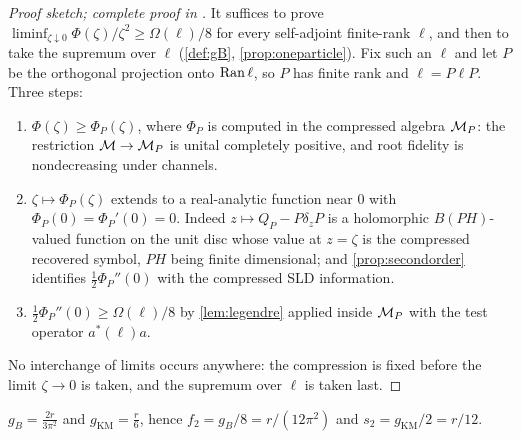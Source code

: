 \begin{proof}[Proof sketch; complete proof in {\cite[\S4, Thm.~4.2]{RigorQL}}]
It suffices to prove
$\liminf_{\zeta\downarrow0}\Phi(\zeta)/\zeta^2\ge\Omega(\ell)/8$ for every
self-adjoint finite-rank $\ell$, and then to take the supremum over $\ell$
(\cref{def:gB}, \cref{prop:oneparticle}).  Fix such an $\ell$ and let $P$ be the
orthogonal projection onto $\operatorname{Ran}\ell$, so $P$ has finite rank and $\ell=P\ell P$.
Three steps:
\begin{enumerate}[label=(\roman*)]
\item $\Phi(\zeta)\ge\Phi_P(\zeta)$, where $\Phi_P$ is computed in the compressed
algebra $\mathcal M_P$: the restriction $\mathcal M\to\mathcal M_P$ is unital completely positive, and
root fidelity is nondecreasing under channels.
\item $\zeta\mapsto\Phi_P(\zeta)$ extends to a real-analytic function near $0$
with $\Phi_P(0)=\Phi_P'(0)=0$.  Indeed $z\mapsto Q_P-P\delta_zP$ is a holomorphic
$B(PH)$-valued function on the unit disc whose value at $z=\zeta$ is the
compressed recovered symbol, $PH$ being finite dimensional; and
\cref{prop:secondorder} identifies $\frac12\Phi_P''(0)$ with the compressed SLD
information.
\item $\frac12\Phi_P''(0)\ge\Omega(\ell)/8$ by \cref{lem:legendre} applied inside
$\mathcal M_P$ with the test operator $a^*(\ell)a$.
\end{enumerate}
No interchange of limits occurs anywhere: the compression is fixed before the
limit $\zeta\to0$ is taken, and the supremum over $\ell$ is taken last.
\end{proof}

\begin{proposition}\label{prop:gBvalue}
$\displaystyle g_B=\frac{2r}{3\pi^2}$ and $g_{\mathrm{KM}}=\frac r6$, hence
$f_2=g_B/8=r/(12\pi^2)$ and $s_2=g_{\mathrm{KM}}/2=r/12$.
\end{proposition}

